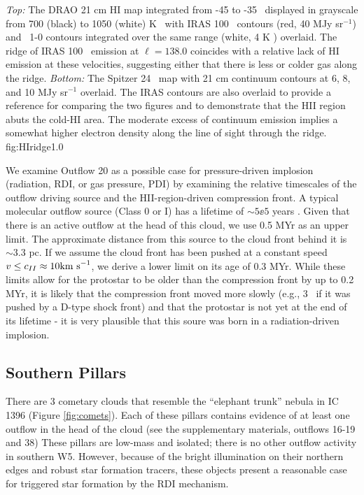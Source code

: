 {{\it Top:} The DRAO 21 cm HI map integrated from -45 to -35 \kms\ displayed in grayscale
from 700 (black) to 1050 (white) K \kms\ with IRAS 100 \um\ contours (red, 40 MJy sr$^{-1}$) and
\twelveco\ 1-0 contours integrated over the same range (white, 4 K \kms)
overlaid.  The ridge of IRAS 100 \um\ emission at $\ell=138.0$ coincides with a
relative lack of HI emission at these velocities, suggesting either that there
is less or colder gas along the ridge.  {\it Bottom:} The Spitzer 24 \um\ map
with 21 cm continuum contours at 6, 8, and 10 MJy sr$^{-1}$ overlaid.  The IRAS contours
are also overlaid to provide a reference for comparing the two figures and to demonstrate
that the HII region abuts the cold-HI area.  The moderate
excess of continuum emission implies a somewhat higher electron density along the 
line of sight through the ridge.}
{fig:HIridge}{1.0}

We examine Outflow 20 as a possible case for pressure-driven implosion
(radiation, RDI, or gas pressure, PDI) by examining the relative timescales of the outflow
driving source and the HII-region-driven compression front.  A typical
molecular outflow source (Class 0 or I) has a lifetime of $\sim5\ee{5}$ years
\citep{Evans2009}.   Given that there is an active outflow at the head of this
cloud, we use 0.5 MYr as an upper limit.  The approximate distance from this
source to the cloud front behind it is $\sim 3.3$ pc.  If we assume the cloud
front has been pushed at a constant speed $v\leq c_{II} \approx 10 \textrm{km~s}^{-1}$,  we
derive a lower limit on its age of 0.3 MYr.  While these limits allow for the
protostar to be older than the compression front by up to 0.2 MYr, it is likely
that the compression front moved more slowly (e.g., 3 \kms\ if it was pushed
by a D-type shock front) and that the protostar is not yet at the end of its
lifetime - it is very plausible that this soure was born in a radiation-driven
implosion.


\subsection{Southern Pillars}
\label{sec:pillars}
There are 3 cometary clouds that resemble the ``elephant trunk'' nebula in IC
1396 (Figure \ref{fig:comets}).  Each of these pillars contains evidence of at
least one outflow in the head of the cloud (see the supplementary materials, outflows
16-19 and 38)
These pillars are low-mass and isolated; there is no other outflow activity in
southern W5.  However, because of the bright illumination on their northern
edges and robust star formation tracers, these objects present a reasonable 
case for triggered star formation by the RDI mechanism.

